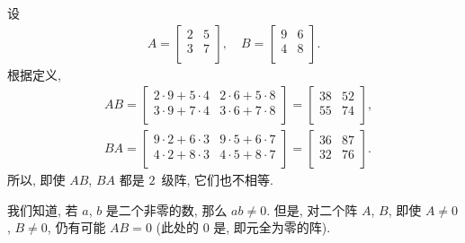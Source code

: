 \documentclass[%
    UTF8,%
    fontset=none,%
    punct=kaiming,%
    zihao=-4,%
    a4paper,%
    oneside,%
]{ctexbook}
\let\emph\relax
\begin{document}
\begin{example}
    设
    \begin{align*}
        A = \begin{bmatrix}
                2 & 5 \\
                3 & 7 \\
            \end{bmatrix},
        \quad
        B = \begin{bmatrix}
                9 & 6 \\
                4 & 8 \\
            \end{bmatrix}.
    \end{align*}
    根据定义,
    \begin{align*}
         &
        AB = \begin{bmatrix}
                 2 \cdot 9 + 5 \cdot 4 & 2 \cdot 6 + 5 \cdot 8 \\
                 3 \cdot 9 + 7 \cdot 4 & 3 \cdot 6 + 7 \cdot 8 \\
             \end{bmatrix}
        = \begin{bmatrix}
              38 & 52 \\
              55 & 74 \\
          \end{bmatrix},
        \\
         &
        BA = \begin{bmatrix}
                 9 \cdot 2 + 6 \cdot 3 & 9 \cdot 5 + 6 \cdot 7 \\
                 4 \cdot 2 + 8 \cdot 3 & 4 \cdot 5 + 8 \cdot 7 \\
             \end{bmatrix}
        = \begin{bmatrix}
              36 & 87 \\
              32 & 76 \\
          \end{bmatrix}.
    \end{align*}
    所以, 即使 \(AB\), \(BA\) 都是 \(2\)~级阵,
    它们也不相等.
\end{example}

我们知道, 若 \(a\), \(b\) 是二个非零的数,
那么 \(ab \neq 0\).
但是, 对二个阵 \(A\), \(B\),
即使 \(A \neq 0\), \(B \neq 0\),
仍有可能 \(AB = 0\)
(此处的 \(0\) 是\emph{零阵},
即元全为零的阵).
\end{document}
